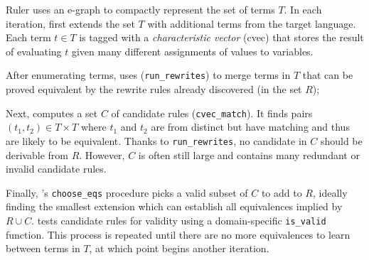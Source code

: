 Ruler uses an e-graph to compactly represent the set of terms $T$.
In each iteration,
   first extends the set $T$
  with additional terms from the target language.
Each term $t \in T$ is tagged with a
 \textit{characteristic vector} (cvec) that
 stores the result of evaluating $t$ given
 many different assignments of values to variables.


After enumerating terms,
   uses \eqsat
  (\lstinline{run_rewrites})
  to  merge terms in $T$
  that can be proved equivalent
  by the rewrite rules already discovered (in the set $R$);

Next,  computes a set $C$ of candidate rules (\lstinline{cvec_match}).
It finds pairs $(t_1, t_2) \in T \times T$
  where $t_1$ and $t_2$
  are from distinct \eclasses
  but have matching \cvecs
  and thus are likely to be equivalent.
Thanks to \lstinline{run_rewrites},
  no candidate in $C$ should be derivable from $R$.
However, $C$ is often still large and
  contains many redundant or invalid candidate rules.

Finally, 's \lstinline{choose_eqs} procedure picks a valid subset of $C$ to add to $R$,
  ideally finding the smallest extension
  which can establish all equivalences implied by $R \cup C$.
 tests candidate rules for validity using a
 domain-specific \lstinline{is_valid} function.
This process is repeated until there are no
  more equivalences to learn between terms in $T$,
  at which point  begins another iteration.




